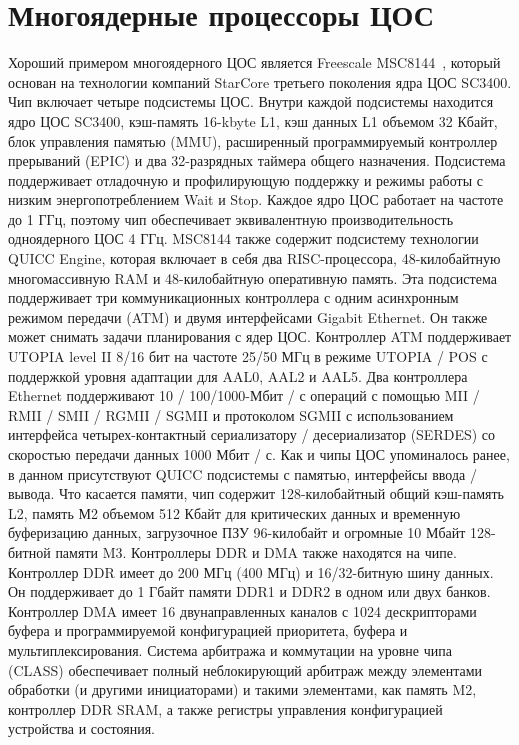 \section{Многоядерные процессоры ЦОС}

Хороший примером многоядерного ЦОС является Freescale MSC8144~\cite{freescale_data_sheet}, который основан на технологии компаний StarCore третьего поколения ядра ЦОС SC3400.
Чип включает четыре подсистемы ЦОС. Внутри каждой подсистемы находится ядро ЦОС SC3400, кэш-память 16-kbyte L1, кэш данных L1 объемом 32 Кбайт, блок управления памятью (MMU), расширенный программируемый контроллер прерываний (EPIC) и два 32-разрядных таймера общего назначения. Подсистема поддерживает отладочную и профилирующую поддержку и режимы работы с низким энергопотреблением Wait и Stop. Каждое ядро ЦОС работает на частоте до 1 ГГц, поэтому чип обеспечивает эквивалентную производительность одноядерного ЦОС 4 ГГц. 
MSC8144 также содержит подсистему технологии QUICC Engine, которая включает в себя два RISC-процессора, 48-килобайтную многомассивную RAM и 48-килобайтную оперативную память. Эта подсистема поддерживает три коммуникационных контроллера с одним асинхронным режимом передачи (ATM) и двумя интерфейсами Gigabit Ethernet. Он также может снимать задачи планирования с ядер ЦОС. 
Контроллер ATM поддерживает UTOPIA level II 8/16 бит на частоте 25/50 МГц в режиме UTOPIA / POS с поддержкой уровня адаптации для AAL0, AAL2 и AAL5. Два контроллера Ethernet поддерживают 10 / 100/1000-Мбит / с операций с помощью MII / RMII / SMII / RGMII / SGMII и протоколом SGMII с использованием интерфейса четырех-контактный сериализатору / десериализатор (SERDES) со скоростью передачи данных 1000 Мбит / с. 
Как и чипы ЦОС упоминалось ранее, в данном присутствуют QUICC подсистемы с памятью, интерфейсы ввода / вывода. Что касается памяти, чип содержит 128-килобайтный общий кэш-память L2, память М2 объемом 512 Кбайт для критических данных и временную буферизацию данных, загрузочное ПЗУ 96-килобайт и огромные 10 Мбайт 128-битной памяти M3. 
Контроллеры DDR и DMA также находятся на чипе. Контроллер DDR имеет до 200 МГц (400 МГц) и 16/32-битную шину данных. Он поддерживает до 1 Гбайт памяти DDR1 и DDR2 в одном или двух банков. Контроллер DMA имеет 16 двунаправленных каналов с 1024 дескрипторами буфера и программируемой конфигурацией приоритета, буфера и мультиплексирования. 
Система арбитража и коммутации на уровне чипа (CLASS) обеспечивает полный неблокирующий арбитраж между элементами обработки (и другими инициаторами) и такими элементами, как память M2, контроллер DDR SRAM, а также регистры управления конфигурацией устройства и состояния. 
